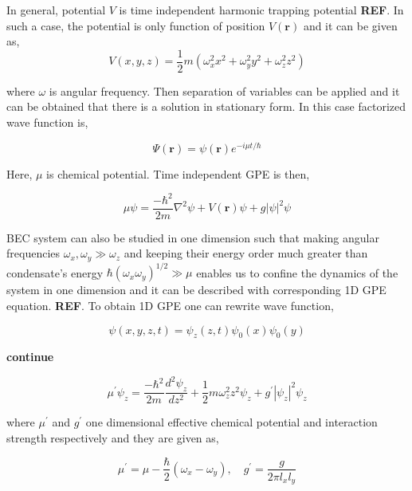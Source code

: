 \documentclass[a4paper,times,12pt]{article}
\begin{document}
In general, potential $V$ is time independent harmonic trapping potential \textbf{REF}. In such a case, the potential is only function of position $V(\boldsymbol{r})$ and it can be given as,
\begin{equation}
\label{eq:GPE_harmonic_potential}
V(x, y, z) = \frac{1}{2}m(\omega_x^2 x^2 + \omega_y^2y^2 + \omega_z^2z^2)
\end{equation}


where $\omega$ is angular frequency. Then separation of variables can be applied and it can be obtained that there is a solution in stationary form. In this case factorized wave function is,

\begin{equation}
\label{eq:GPE_time_indep_wave_func}
\Psi(\boldsymbol{r}) = \psi(\boldsymbol{r})e^{-i\mu t/\hbar}
\end{equation}

Here, $\mu$ is chemical potential. Time independent GPE is then,

\begin{equation}
\label{eq:GPE_time_indep}
\mu\psi = \frac{-\hbar^2}{2m}\nabla^2\psi + V(\boldsymbol{r})\psi + g|\psi|^2\psi 
\end{equation}

BEC system can also be studied in one dimension such that making angular frequencies $\omega_x, \omega_y \gg \omega_z$ and keeping their energy order much greater than condensate's energy $ \hbar(\omega_x \omega_y)^{1/2} \gg \mu $ enables us to confine the dynamics of the system in one dimension and it can be described with corresponding 1D GPE equation. \textbf{REF}. To obtain 1D GPE one can rewrite wave function,

\begin{equation}
\label{eq:GPE_time_indep_wave_func_seperated}
\psi(x, y, z, t) = \psi_z(z, t)\psi_0(x)\psi_0(y)
\end{equation}

\textbf{continue}

\begin{equation}
\label{eq:GPE_1D}
\mu^{\prime}\psi_z = \frac{-\hbar^2}{2m}\frac{d^2\psi_z}{dz^2} + \frac{1}{2}m\omega_z^2 z^2\psi_z + g^{\prime}|\psi_z|^2\psi_z 
\end{equation}

where $\mu^{\prime}$ and $g^{\prime}$ one dimensional effective chemical potential and interaction strength respectively and they are given as,

\begin{equation}
\label{eq:GPE_1D_chem_inter}
\mu^{\prime} = \mu - \frac{\hbar}{2}(\omega_x - \omega_y), \quad g^{\prime} = \frac{g}{2\pi l_x l_y}
\end{equation}
\end{document}
